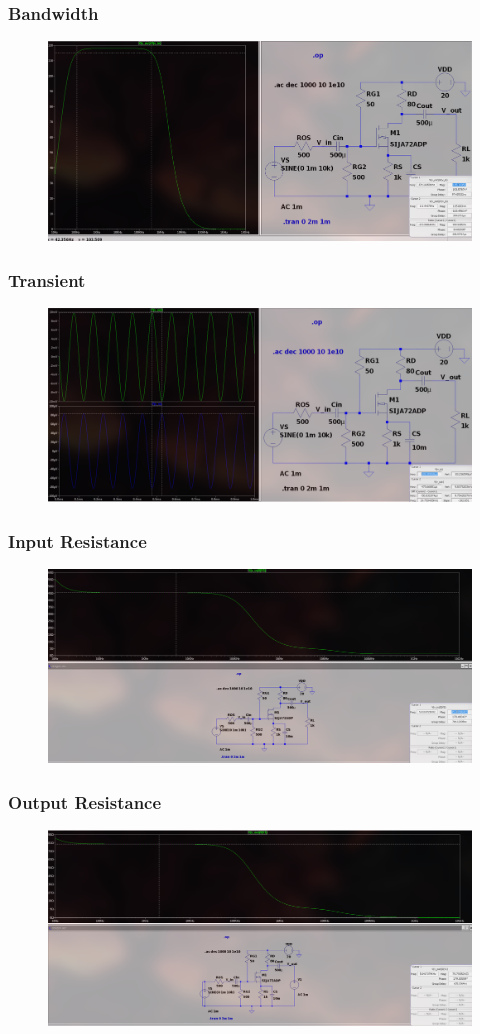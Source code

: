 \documentclass{article}
\begin{document}
\subsubsection{Bandwidth}
\begin{figure}[h!]
        \centering
        \includegraphics[width=0.7\linewidth]{figs/mosfet_cs_bw.png}
    \end{figure}
\subsubsection{Transient}
\begin{figure}[h!]
        \centering
        \includegraphics[width=0.7\linewidth]{figs/mosfet_cs_tr.png}
    \end{figure}
    \pagebreak
\subsubsection{Input Resistance}
\begin{figure}[h!]
        \centering
        \includegraphics[width=0.7\linewidth]{figs/mosfet_cs_rin.png}
    \end{figure}
\subsubsection{Output Resistance}
\begin{figure}[h!]
        \centering
        \includegraphics[width=0.7\linewidth]{figs/mosfet_cs_rout.png}
    \end{figure}
\end{document}
